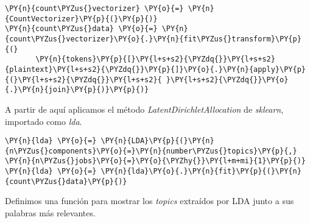 \vspace{0.5cm}
   \begin{tcolorbox}[breakable, size=fbox, boxrule=1pt, pad at break*=1mm,colback=cellbackground, colframe=cellborder]
\begin{Verbatim}[commandchars=\\\{\}]
\PY{n}{count\PYZus{}vectorizer} \PY{o}{=} \PY{n}{CountVectorizer}\PY{p}{(}\PY{p}{)}
\PY{n}{count\PYZus{}data} \PY{o}{=} \PY{n}{count\PYZus{}vectorizer}\PY{o}{.}\PY{n}{fit\PYZus{}transform}\PY{p}{(}
       \PY{n}{tokens}\PY{p}{[}\PY{l+s+s2}{\PYZdq{}}\PY{l+s+s2}{plaintext}\PY{l+s+s2}{\PYZdq{}}\PY{p}{]}\PY{o}{.}\PY{n}{apply}\PY{p}{(}\PY{l+s+s2}{\PYZdq{}}\PY{l+s+s2}{ }\PY{l+s+s2}{\PYZdq{}}\PY{o}{.}\PY{n}{join}\PY{p}{)}\PY{p}{)}      
\end{Verbatim}
\end{tcolorbox}

A partir de aquí aplicamos el método \textit{LatentDirichletAllocation} de \textit{sklearn}, importado como \textit{lda}.

\vspace{0.5cm}
    \begin{tcolorbox}[breakable, size=fbox, boxrule=1pt, pad at break*=1mm,colback=cellbackground, colframe=cellborder]
\begin{Verbatim}[commandchars=\\\{\}]
\PY{n}{lda} \PY{o}{=} \PY{n}{LDA}\PY{p}{(}\PY{n}{n\PYZus{}components}\PY{o}{=}\PY{n}{number\PYZus{}topics}\PY{p}{,} \PY{n}{n\PYZus{}jobs}\PY{o}{=}\PY{o}{\PYZhy{}}\PY{l+m+mi}{1}\PY{p}{)}
\PY{n}{lda} \PY{o}{=} \PY{n}{lda}\PY{o}{.}\PY{n}{fit}\PY{p}{(}\PY{n}{count\PYZus{}data}\PY{p}{)}
\end{Verbatim}
\end{tcolorbox}




Definimos una función para mostrar los \textit{topics} extraídos por  LDA junto a sus palabras más relevantes.
\vspace{0.5cm}

